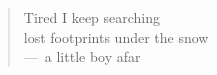 \documentclass[a4paper,12pt]{article}
\begin{document}
\begin{verse}
  Tired I keep searching \\
  lost footprints under the snow \\
  ---~a little boy afar
\end{verse}








\end{document}

